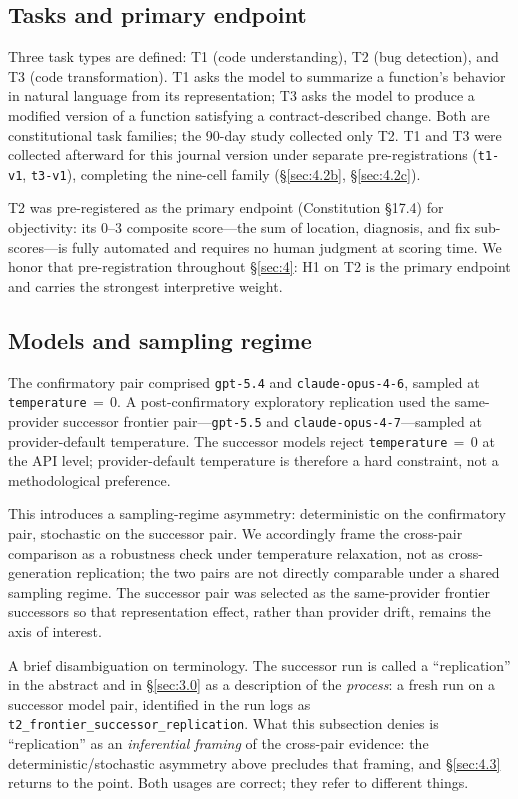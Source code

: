 \documentclass[11pt]{article}
\begin{document}
\subsection{Tasks and primary endpoint}
\label{sec:3.3}
Three task types are defined: T1 (code understanding), T2 (bug
detection), and T3 (code transformation). T1 asks the model to
summarize a function's behavior in natural language from its
representation; T3 asks the model to produce a modified version
of a function satisfying a contract-described change. Both are
constitutional task families; the 90-day study collected only
T2. T1 and T3 were collected afterward for this journal version
under separate pre-registrations (\texttt{t1-v1},
\texttt{t3-v1}), completing the nine-cell family
(\S\ref{sec:4.2b}, \S\ref{sec:4.2c}).

T2 was pre-registered as the primary endpoint (Constitution \S17.4)
for objectivity: its 0--3 composite score---the sum of location,
diagnosis, and fix sub-scores---is fully automated and requires no
human judgment at scoring time. We honor that pre-registration
throughout \S\ref{sec:4}: H1 on T2 is the primary endpoint and
carries the strongest interpretive weight.

\subsection{Models and sampling regime}
\label{sec:3.4}
The confirmatory pair comprised \texttt{gpt-5.4} and
\texttt{claude-opus-4-6}, sampled at \texttt{temperature}\,$=$\,$0$.
A post-confirmatory exploratory replication used the same-provider
successor frontier pair---\texttt{gpt-5.5} and
\texttt{claude-opus-4-7}---sampled at provider-default temperature.
The successor models reject \texttt{temperature}\,$=$\,$0$ at the
API level; provider-default temperature is therefore a hard
constraint, not a methodological preference.

This introduces a sampling-regime asymmetry: deterministic on the
confirmatory pair, stochastic on the successor pair. We accordingly
frame the cross-pair comparison as a robustness check under
temperature relaxation, not as cross-generation replication; the two
pairs are not directly comparable under a shared sampling regime. The
successor pair was selected as the same-provider frontier successors
so that representation effect, rather than provider drift, remains
the axis of interest.

A brief disambiguation on terminology. The successor run is called
a ``replication'' in the abstract and in \S\ref{sec:3.0} as a
description of the \emph{process}: a fresh run on a successor model
pair, identified in the run logs as
\texttt{t2\_frontier\_successor\_replication}. What this subsection
denies is ``replication'' as an \emph{inferential framing} of the
cross-pair evidence: the deterministic/stochastic asymmetry above
precludes that framing, and \S\ref{sec:4.3} returns to the point.
Both usages are correct; they refer to different things.
\end{document}
